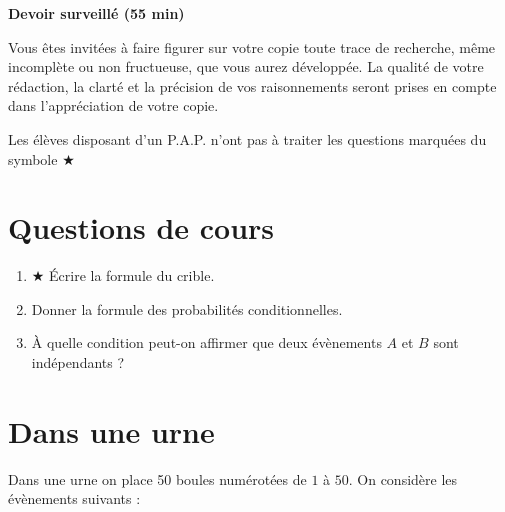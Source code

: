 \documentclass[oneside,12pt]{exam}          %
\begin{document}
\footer{}{\footnotesize \etablissement}{\thepage / \numpages}

\hrulefill\raisebox{-1.9pt}{\quad\decofourleft~\decosix~\decofourright \quad}\hrulefill

\begin{center}
	\textbf{\large Devoir surveillé  (55 min)}
\end{center}
\vspace{-5pt}
Vous êtes invité\textperiodcentered e\textperiodcentered s à faire figurer sur votre copie toute trace de recherche, même incomplète ou non fructueuse, que vous aurez développée. La qualité de votre rédaction, la clarté et la précision de vos raisonnements seront prises en compte dans l’appréciation de votre copie.

Les élèves disposant d'un P.A.P. n'ont pas à traiter les questions marquées du symbole $\bigstar$

\vspace{-8pt}\hrulefill\raisebox{-1.9pt}{\quad\decofourleft~\decosix~\decofourright \quad}\hrulefill
\vspace{5pt}



\section{Questions de cours}
\begin{enumerate}[itemsep = 0pt]
	\item $\bigstar$ Écrire la formule du crible.
	\item Donner la formule des probabilités conditionnelles.
	\item À quelle condition peut-on affirmer que deux évènements $A$ et $B$ sont indépendants ?
\end{enumerate}



\section{Dans une urne}
Dans une urne on place 50 boules numérotées de $1$ à $50$. On considère les évènements suivants :
\end{document}
